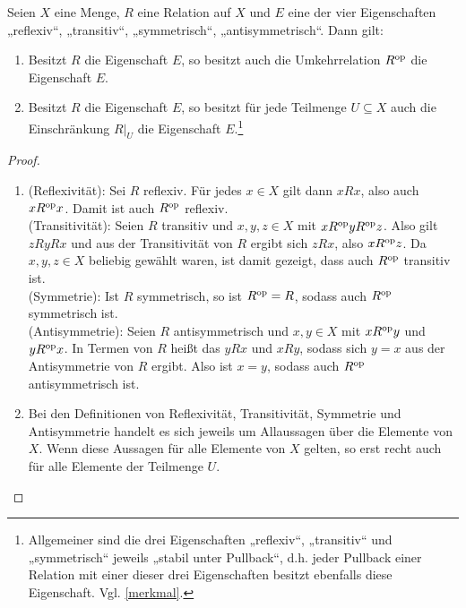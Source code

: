 \begin{satz} \label{releigstabil}
    Seien $X$ eine Menge, $R$ eine Relation auf $X$ und $E$ eine der vier Eigenschaften „reflexiv“, „transitiv“, „symmetrisch“, „antisymmetrisch“. Dann gilt:
    \begin{enumerate}
        \item Besitzt $R$ die Eigenschaft $E$, so besitzt auch die Umkehrrelation $R^{\mathrm{op}}$ die Eigenschaft $E$.
        \item Besitzt $R$ die Eigenschaft $E$, so besitzt für jede Teilmenge $U\subseteq X$ auch die Einschränkung $R\vert_U$ die Eigenschaft $E$.\footnote{Allgemeiner sind die drei Eigenschaften „reflexiv“, „transitiv“ und „symmetrisch“ jeweils „stabil unter Pullback“, d.h. jeder Pullback einer Relation mit einer dieser drei Eigenschaften besitzt ebenfalls diese Eigenschaft. Vgl. \cref{merkmal}.}
    \end{enumerate}
\end{satz}
\begin{proof} \quad
    \begin{enumerate}
    \item (Reflexivität): Sei $R$ reflexiv. Für jedes $x\in X$ gilt dann  $xRx$, also auch $xR^{\mathrm{op}} x$. Damit ist auch $R^{\mathrm{op}}$ reflexiv. \\[0.5em]
    (Transitivität): Seien $R$ transitiv und $x,y,z\in X$ mit $xR^{\mathrm{op}} yR^{\mathrm{op}} z$. Also gilt $zRyRx$ und aus der Transitivität von $R$ ergibt sich $zRx$, also $xR^{\mathrm{op}} z$. Da $x,y,z\in X$ beliebig gewählt waren, ist damit gezeigt, dass auch $R^{\mathrm{op}}$ transitiv ist. \\[0.5em]
    (Symmetrie): Ist $R$ symmetrisch, so ist $R^{\mathrm{op}}=R$, sodass auch $R^{\mathrm{op}}$ symmetrisch ist. \\[0.5em]
    (Antisymmetrie): Seien $R$ antisymmetrisch und $x,y\in X$ mit $x R^{\mathrm{op}} y$ und $y R^{\mathrm{op}} x$. In Termen von $R$ heißt das $y Rx$ und $x Ry$, sodass sich $y=x$ aus der Antisymmetrie von $R$ ergibt. Also ist $x=y$, sodass auch $R^{\mathrm{op}}$ antisymmetrisch ist.
    \item Bei den Definitionen von Reflexivität, Transitivität, Symmetrie und Antisymmetrie handelt es sich jeweils um Allaussagen über die Elemente von $X$. Wenn diese Aussagen für alle Elemente von $X$ gelten, so erst recht auch für alle Elemente der Teilmenge $U$. \qedhere
    \end{enumerate}
\end{proof}





